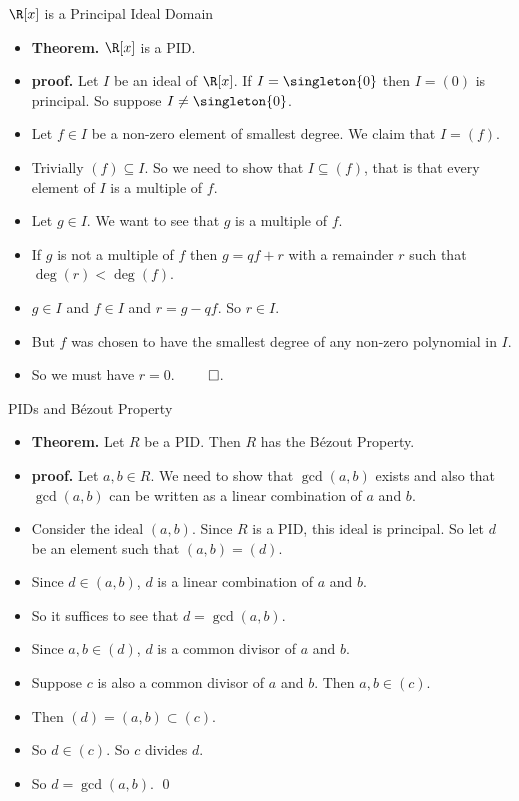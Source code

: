 \documentclass{beamer}
\begin{document}
\begin{frame}{$\R[x]$ is a Principal Ideal Domain}

\begin{itemize}
  \item \textbf{Theorem.} $\R[x]$ is a PID.
  \item \textbf{proof.} Let $I$ be an ideal of $\R[x]$. If $I = \singleton{0}$ then $I=(0)$ is principal. So suppose $I\not=\singleton{0}$.
  \item Let $f\in I$ be a non-zero element of smallest degree. We claim that $I=(f)$.
  \item Trivially $(f) \subseteq I$. So we need to show that $I \subseteq (f)$, that is that every element of $I$ is a multiple of $f$.
  \item Let $g\in I$. We want to see that $g$ is a multiple of $f$.
  \item If $g$ is not a multiple of $f$ then $g=qf+r$ with a remainder $r$ such that $\deg(r) < \deg(f)$.
  \item $g\in I$ and $f\in I$ and $r=g-qf$. So $r\in I$.
  \item But $f$ was chosen to have the smallest degree of any non-zero polynomial in $I$.
  \item So we must have $r=0$. $\qed$.
\end{itemize}

\end{frame}



\begin{frame}{PIDs and B\'{e}zout Property}

\begin{itemize}
  \item \textbf{Theorem.} Let $R$ be a PID. Then $R$ has the B\'{e}zout Property.
  \item \textbf{proof.}  Let $a,b\in R$. We need to show that $\gcd(a,b)$ exists and also that $\gcd(a,b)$
  can be written as a linear combination of $a$ and $b$.
  \item Consider the ideal $(a,b)$. Since $R$ is a PID, this ideal is principal. So let $d$ be an element
  such that $(a,b) = (d)$.
  \item Since $d\in(a,b)$, $d$ is a linear combination of $a$ and $b$.
  \item So it suffices to see that $d=\gcd(a,b)$.
  \item Since $a,b \in (d)$, $d$ is a common divisor of $a$ and $b$.
  \item Suppose $c$ is also a common divisor of $a$ and $b$. Then $a,b\in (c)$.
  \item Then $(d) = (a,b) \subset (c)$.
  \item So $d\in (c)$. So $c$ divides $d$.
  \item So $d=\gcd(a,b)$. \qed
\end{itemize}

\end{frame}
\end{document}
